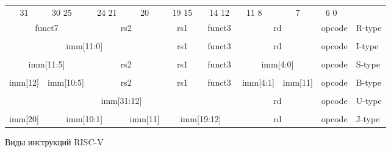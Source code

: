 \documentclass[14pt, russian, onesize]{extreport}
\begin{document}
\newcommand{\instbit}[1]{\mbox{\scriptsize #1}}
\newcommand{\instbitrange}[2]{~\instbit{#1} \hfill \instbit{#2}~}
\begin{figure}[h]
\begin{small} \begin{center} \setlength{\tabcolsep}{4pt} \begin{tabular}{p{0.3in}@{}p{0.8in}@{}p{0.6in}@{}p{0.18in}@{}p{0.7in}@{}p{0.6in}@{}p{0.6in}@{}p{0.3in}@{}p{0.5in}l} \\ \multicolumn{1}{c}{\instbit{31}} & \instbitrange{30}{25} & \instbitrange{24}{21} & \multicolumn{1}{c}{\instbit{20}} & \instbitrange{19}{15} & \instbitrange{14}{12} & \instbitrange{11}{8} & \multicolumn{1}{c}{\instbit{7}} & \instbitrange{6}{0} \\ \cline{1-9} \multicolumn{2}{|c|}{funct7} & \multicolumn{2}{c|}{rs2} & \multicolumn{1}{c|}{rs1} & \multicolumn{1}{c|}{funct3} & \multicolumn{2}{c|}{rd} & \multicolumn{1}{c|}{opcode} & R-type \\ \cline{1-9} \\ \cline{1-9} \multicolumn{4}{|c|}{imm[11:0]} & \multicolumn{1}{c|}{rs1} & \multicolumn{1}{c|}{funct3} & \multicolumn{2}{c|}{rd} & \multicolumn{1}{c|}{opcode} & I-type \\ \cline{1-9} \\ \cline{1-9} \multicolumn{2}{|c|}{imm[11:5]} & \multicolumn{2}{c|}{rs2} & \multicolumn{1}{c|}{rs1} & \multicolumn{1}{c|}{funct3} & \multicolumn{2}{c|}{imm[4:0]} & \multicolumn{1}{c|}{opcode} & S-type \\ \cline{1-9} \\ \cline{1-9} \multicolumn{1}{|c|}{imm[12]} & \multicolumn{1}{c|}{imm[10:5]} & \multicolumn{2}{c|}{rs2} & \multicolumn{1}{c|}{rs1} & \multicolumn{1}{c|}{funct3} & \multicolumn{1}{c|}{imm[4:1]} & \multicolumn{1}{c|}{imm[11]} & \multicolumn{1}{c|}{opcode} & B-type \\ \cline{1-9} \\ \cline{1-9} \multicolumn{6}{|c|}{imm[31:12]} & \multicolumn{2}{c|}{rd} & \multicolumn{1}{c|}{opcode} & U-type \\ \cline{1-9} \\ \cline{1-9} \multicolumn{1}{|c|}{imm[20]} & \multicolumn{2}{c|}{imm[10:1]} & \multicolumn{1}{c|}{imm[11]} & \multicolumn{2}{c|}{imm[19:12]} & \multicolumn{2}{c|}{rd} & \multicolumn{1}{c|}{opcode} & J-type \\ \cline{1-9} \end{tabular} \end{center} \end{small} \caption{Виды инструкций RISC-V} \label{fig:baseinstformatsimm}
\end{figure}
\end{document}
